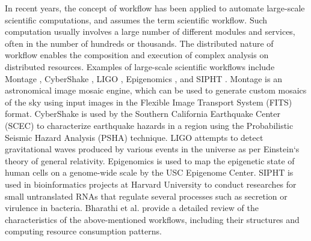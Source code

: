 In recent years, the concept of workflow has been applied to automate large-scale scientific computations, and assumes the term scientific workflow. Such computation usually involves a large number of different modules and services, often in the number of hundreds or thousands. The distributed nature of workflow enables the composition and execution of complex analysis on distributed resources. Examples of large-scale scientific workflows include Montage \cite{montage} \cite{web:montage}, CyberShake \cite{cybershake}, LIGO \cite{ligo}, Epigenomics \cite{bharathi2008characterization}, and SIPHT \cite{livny2008high}. Montage is an astronomical image mosaic engine, which can be used to generate custom mosaics of the sky using input images in the Flexible Image Transport System (FITS) format. CyberShake is used by the Southern California Earthquake Center (SCEC) to characterize earthquake hazards in a region using the Probabilistic Seismic Hazard Analysis (PSHA) technique. LIGO attempts to detect gravitational waves produced by various events in the universe as per Einstein`s theory of general relativity. Epigenomics is used to map the epigenetic state of human cells on a genome-wide scale by the USC Epigenome Center. SIPHT is used in bioinformatics projects at Harvard University to conduct researches for small untranslated RNAs that regulate several processes such as secretion or virulence in bacteria. Bharathi et al. \cite{bharathi2008characterization} provide a detailed review of the characteristics of the above-mentioned workflows, including their structures and computing resource consumption patterns. 

